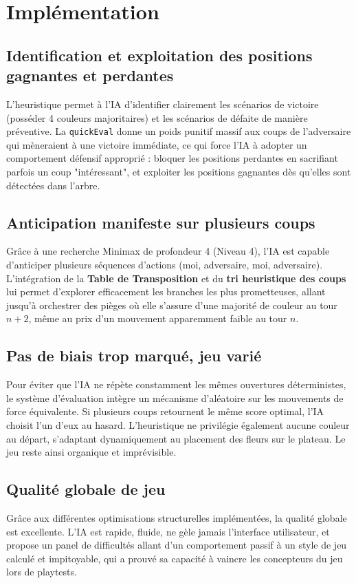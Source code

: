 \documentclass[12pt, a4paper]{article}
\begin{document}
\section{Implémentation}

\subsection{Identification et exploitation des positions gagnantes et perdantes}
L'heuristique permet à l'IA d'identifier clairement les scénarios de victoire (posséder 4 couleurs majoritaires) et les scénarios de défaite de manière préventive. La \texttt{quickEval} donne un poids punitif massif aux coups de l'adversaire qui mèneraient à une victoire immédiate, ce qui force l'IA à adopter un comportement défensif approprié : bloquer les positions perdantes en sacrifiant parfois un coup "intéressant", et exploiter les positions gagnantes dès qu'elles sont détectées dans l'arbre.

\subsection{Anticipation manifeste sur plusieurs coups}
Grâce à une recherche Minimax de profondeur 4 (Niveau 4), l'IA est capable d'anticiper plusieurs séquences d'actions (moi, adversaire, moi, adversaire). L'intégration de la \textbf{Table de Transposition} et du \textbf{tri heuristique des coups} lui permet d'explorer efficacement les branches les plus prometteuses, allant jusqu'à orchestrer des pièges où elle s'assure d'une majorité de couleur au tour $n+2$, même au prix d'un mouvement apparemment faible au tour $n$.

\subsection{Pas de biais trop marqué, jeu varié}
Pour éviter que l'IA ne répète constamment les mêmes ouvertures déterministes, le système d'évaluation intègre un mécanisme d'aléatoire sur les mouvements de force équivalente. Si plusieurs coups retournent le même score optimal, l'IA choisit l'un d'eux au hasard. L'heuristique ne privilégie également aucune couleur au départ, s'adaptant dynamiquement au placement des fleurs sur le plateau. Le jeu reste ainsi organique et imprévisible.

\subsection{Qualité globale de jeu}
Grâce aux différentes optimisations structurelles implémentées, la qualité globale est excellente. L'IA est rapide, fluide, ne gèle jamais l'interface utilisateur, et propose un panel de difficultés allant d'un comportement passif à un style de jeu calculé et impitoyable, qui a prouvé sa capacité à vaincre les concepteurs du jeu lors de playtests.
\end{document}
